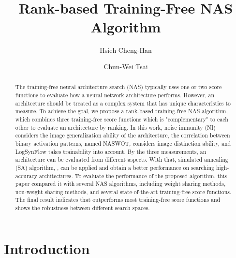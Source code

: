\documentclass[sigconf]{acmart}
\begin{document}
\title{Rank-based Training-Free NAS Algorithm}

\author{Hsieh Cheng-Han}

\author{Chun-Wei Tsai}

\begin{abstract}
    The training-free neural architecture search (NAS) typically uses one or 
    two score functions to evaluate how a neural network architecture performs. 
    However, an architecture should be treated as a complex system that has 
    unique characteristics to measure. 
    To achieve the goal, we propose a rank-based training-free NAS algorithm, 
    which combines three training-free score functions which is "complementary" 
    to each other to evaluate an architecture by ranking. 
    In this work, noise immunity (NI) considers the image generalization 
    ability of the architecture, the correlation between binary activation 
    patterns, named NASWOT, considers image distinction ability, and LogSynFlow 
    takes trainability into account. By the three measurements, an 
    architecture can be evaluated from different aspects. 
    With that, simulated annealing (SA) algorithm, \palg{}, 
    can be applied and obtain a better performance on searching high-accuracy architectures.  
    To evaluate the performance of the proposed algorithm, this paper compared 
    it with several NAS algorithms, including weight sharing methods, 
    non-weight sharing methods, and several state-of-the-art training-free 
    score functions. The final result indicates that \palg{} outperforms most 
    training-free score functions and shows the robustness between different 
    search spaces. 

\end{abstract}
\maketitle

\section{Introduction}
\label{sec:introduction}
\end{document}
